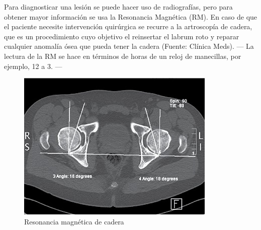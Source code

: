 \documentclass[11pt]{book}
\newcommand{\forceindent}{\leavevmode{\parindent=2em\indent}} %
\begin{document}
	        
	        \forceindent Para diagnosticar una lesión se puede hacer uso de radiografías, pero para obtener mayor información se usa la Resonancia Magnética (RM). En caso de que el paciente necesite intervención quirúrgica se recurre a la artroscopía de cadera, que es un procedimiento cuyo objetivo el reinsertar el labrum roto y reparar cualquier anomalía ósea que pueda tener la cadera (Fuente: Clínica Meds). --- La lectura de la RM se hace en términos de horas de un reloj de manecillas, por ejemplo, 12 a 3. ---
	        
	        \begin{figure}[h]
	        	\begin{center}
	        		\centering
	        		\includegraphics[scale=.6]{mrilabraltear}
	        		\caption{Resonancia magnética de cadera}
	        		\label{fig:mrilabraltear}
	        	\end{center}
	        \end{figure}			
\end{document}
